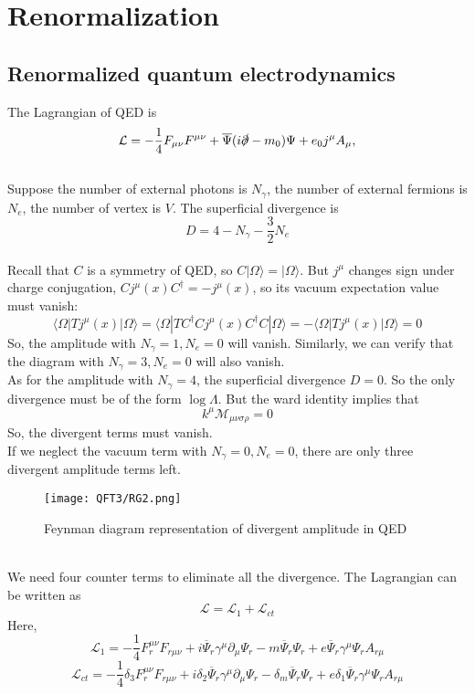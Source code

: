 \documentclass[cyan]{elegantnote}
\begin{document}
\section{Renormalization}
\subsection{Renormalized quantum electrodynamics}
The Lagrangian of QED is
\[\mathcal{L} = -\frac{1}{4}F_{\mu\nu}F^{\mu\nu} + \overline{\Psi} (i\slashed{\partial}-m_0) \Psi + e_0j^{\mu} A_{\mu}, \]
\\
Suppose the number of external photons is $N_{\gamma}$, the number of external fermions is $N_{e}$, the number of vertex is $V$. The superficial divergence is
\[D = 4 -N_{\gamma} - \frac{3}{2}N_{e}\]
\\
Recall that $C$ is a symmetry of QED, so $C|\Omega\rangle = | \Omega \rangle$. But $j^{\mu}$ changes sign under charge conjugation, $C j^{\mu}(x)C^{\dagger} = - j^{\mu}(x)$, so its vacuum expectation value must vanish:
\[\langle \Omega | T j^{\mu}(x) | \Omega \rangle = \langle \Omega | T C^{\dagger}C j^{\mu}(x)C^{\dagger}C | \Omega \rangle = -\langle \Omega | T j^{\mu}(x) | \Omega \rangle = 0 \]
So, the amplitude with $N_{\gamma} = 1,N_{e}=0$ will vanish. Similarly, we can verify that the diagram with $N_{\gamma} = 3,N_e=0$ will also vanish.
\\
As for the amplitude with $N_{\gamma} = 4$, the superficial divergence $D = 0$. So the only divergence must be of the form $\log \Lambda$. But the ward identity implies that
\[k^{\mu}\mathcal{M}_{\mu\nu\sigma\rho} = 0\]
So, the divergent terms must vanish.
\\
If we neglect the vacuum term with $N_{\gamma}=0,N_{e}=0$, there are only three divergent amplitude terms left. 
\begin{figure}[!h]
\centering
\texttt{[image: QFT3/RG2.png]}
\caption{Feynman diagram representation of divergent amplitude in QED}
\end{figure}\\
We need four counter terms to eliminate all the divergence. The Lagrangian can be written as
\[\mathcal{L} = \mathcal{L}_1 + \mathcal{L}_{ct}\]
Here,
\[\mathcal{L}_1 = -\frac{1}{4}F_r^{\mu\nu}F_{r\mu\nu} +  i\overline{\Psi}_r \gamma^{\mu} \partial_{\mu} \Psi_r - m \overline{\Psi}_r \Psi_r + e \overline{\Psi}_r\gamma^{\mu}\Psi_r A_{r\mu} \]
\[\mathcal{L}_{ct} = -\frac{1}{4}\delta_3 F_r^{\mu\nu}F_{r\mu\nu} + i\delta_{2}\overline{\Psi}_r \gamma^{\mu} \partial_{\mu} \Psi_r - \delta_m \overline{\Psi}_r \Psi_r + e \delta_1 \overline{\Psi}_r\gamma^{\mu}\Psi_r A_{r\mu} \]
\end{document}
